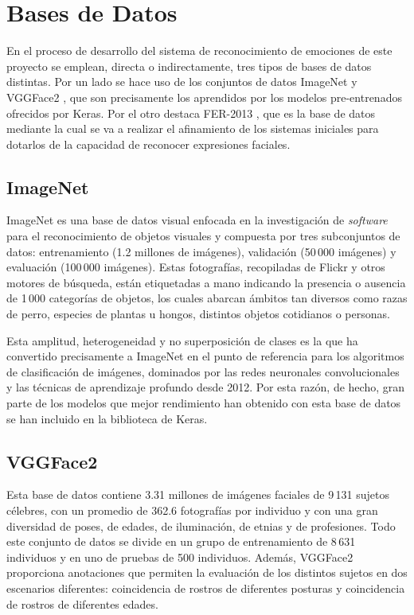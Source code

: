 \section{Bases de Datos}

En el proceso de desarrollo del sistema de reconocimiento de emociones de este proyecto se emplean, directa o indirectamente, tres tipos de bases de datos distintas. Por un lado se hace uso de los conjuntos de datos ImageNet \cite{ImageNet} y VGGFace2 \cite{VGGFace2}, que son precisamente los aprendidos por los modelos pre-entrenados ofrecidos por Keras. Por el otro destaca FER-2013 \cite{FER-2013}, que es la base de datos mediante la cual se va a realizar el afinamiento de los sistemas iniciales para dotarlos de la capacidad de reconocer expresiones faciales.

\subsection{ImageNet} \label{Chapter:ImageNet}

ImageNet es una base de datos visual enfocada en la investigación de \textit{software} para el reconocimiento de objetos visuales y compuesta por tres subconjuntos de datos: entrenamiento (1.2 millones de imágenes), validación (50\,000 imágenes) y evaluación (100\,000 imágenes). Estas fotografías, recopiladas de Flickr y otros motores de búsqueda, están etiquetadas a mano indicando la presencia o ausencia de 1\,000 categorías de objetos, los cuales abarcan ámbitos tan diversos como razas de perro, especies de plantas u hongos, distintos objetos cotidianos o personas.

Esta amplitud, heterogeneidad y no superposición de clases es la que ha convertido precisamente a ImageNet en el punto de referencia para los algoritmos de clasificación de imágenes, dominados por las redes neuronales convolucionales y las técnicas de aprendizaje profundo desde 2012. Por esta razón, de hecho, gran parte de los modelos que mejor rendimiento han obtenido con esta base de datos se han incluido en la biblioteca de Keras.

\subsection{VGGFace2} \label{Chapter:VGGFace2}

Esta base de datos contiene 3.31 millones de imágenes faciales de 9\,131 sujetos célebres, con un promedio de 362.6 fotografías por individuo y con una gran diversidad de poses, de edades, de iluminación, de etnias y de profesiones. Todo este conjunto de datos se divide en un grupo de entrenamiento de 8\,631 individuos y en uno de pruebas de 500 individuos. Además, VGGFace2 proporciona anotaciones que permiten la evaluación de los distintos sujetos en dos escenarios diferentes: coincidencia de rostros de diferentes posturas y coincidencia de rostros de diferentes edades.

